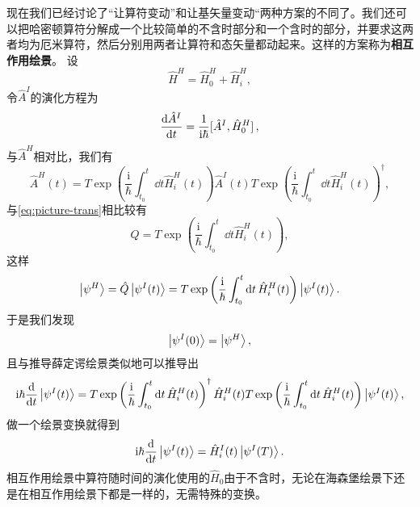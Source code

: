 \documentclass[hyperref, UTF8, a4paper]{ctexart}
\newcommand*{\ii}{\mathrm{i}}
\begin{document}
现在我们已经讨论了“让算符变动”和让基矢量变动“两种方案的不同了。我们还可以把哈密顿算符分解成一个比较简单的不含时部分和一个含时的部分，并要求这两者均为厄米算符，然后分别用两者让算符和态矢量都动起来。这样的方案称为\textbf{相互作用绘景}。
设
\begin{equation}
    \hat{H}^H = \hat{H}^H_0 + \hat{H}^H_i,
\end{equation}
令$\hat{A}^I$的演化方程为
\begin{equation}
    \dv{\hat{A}^I}{t} = \frac{1}{\ii \hbar} \comm*{\hat{A}^I}{\hat{H}^H_0},
\end{equation}
与$\hat{A}^H$相对比，我们有
\[
    \hat{A}^H (t) = T \exp \left( \frac{\ii}{\hbar} \int_{t_0}^t \dd{t} \hat{H}^H_i (t) \right) \hat{A}^I (t) T \exp \left(\frac{\ii}{\hbar} \int_{t_0}^t \dd{t} \hat{H}^H_i (t) \right)^\dagger,
\]
与\eqref{eq:picture-trans}相比较有
\[
    \hat{Q} = T \exp \left( \frac{\ii}{\hbar} \int_{t_0}^t \dd{t} \hat{H}^H_i (t) \right),
\]
这样
\[
    \ket{\psi^H} = \hat{Q} \ket{\psi^I (t)} = T \exp \left( \frac{\ii}{\hbar} \int_{t_0}^t \dd{t} \hat{H}^H_i (t) \right) \ket{\psi^I (t)}.
\]
于是我们发现
\[
    \ket{\psi^I (0)} = \ket{\psi^H},
\]
且与推导薛定谔绘景类似地可以推导出
\[
    \ii \hbar \dv{t} \ket{\psi^I (t)} = T \exp \left( \frac{\ii}{\hbar} \int_{t_0}^t \dd{t} \hat{H}^H_i (t) \right)^\dagger \hat{H}_i^H (t) T \exp \left( \frac{\ii}{\hbar} \int_{t_0}^t \dd{t} \hat{H}^H_i (t) \right) \ket{\psi^I(t)},
\]
做一个绘景变换就得到
\begin{equation}
    \ii \hbar \dv{t} \ket{\psi^I (t)} = \hat{H}^I_i (t) \ket{\psi^I (T)}.
\end{equation}
相互作用绘景中算符随时间的演化使用的$\hat{H}_0$由于不含时，无论在海森堡绘景下还是在相互作用绘景下都是一样的，无需特殊的变换。
\end{document}
